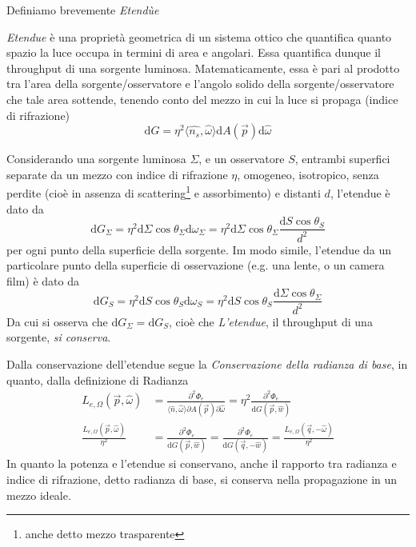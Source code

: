 Definiamo brevemente \textit{Etend\`ue}
\begin{definitionS}
	\textit{Etendue} \`e una propriet\`a geometrica di un sistema ottico che quantifica quanto spazio la luce occupa in termini di area e angolari.
	Essa quantifica dunque il throughput di una sorgente luminosa. Matematicamente, essa \`e pari al prodotto tra l'area della sorgente/osservatore 
	e l'angolo solido della sorgente/osservatore che tale area sottende, tenendo conto del mezzo in cui la luce si propaga (indice di rifrazione)
	\[ \mathrm{d}G = \eta^2\langle \hat{n_s},\hat{\omega} \rangle\mathrm{d}A(\vec{p})\mathrm{d}\hat{\omega}\]
\end{definitionS}
Considerando una sorgente luminosa $\Sigma$, e un osservatore $S$, entrambi superfici separate da un mezzo con indice di rifrazione $\eta$, omogeneo,
isotropico, senza perdite (cio\`e in assenza di scattering\footnote{anche detto mezzo trasparente} e assorbimento) e distanti $d$, l'etendue \`e dato da
\[ \mathrm{d}G_\Sigma = \eta^2\mathrm{d}\Sigma\cos\theta_\Sigma\mathrm{d}\omega_\Sigma 
					  = \eta^2\mathrm{d}\Sigma\cos\theta_\Sigma\frac{\mathrm{d}S\cos\theta_S}{d^2} \]
per ogni punto della superficie della sorgente. Im modo simile, l'etendue da un particolare punto della superficie di osservazione (e.g. una lente, o
un camera film) \`e dato da
\[ \mathrm{d}G_S = \eta^2\mathrm{d}S\cos\theta_S\mathrm{d}\omega_S 
				 = \eta^2\mathrm{d}S\cos\theta_S\frac{\mathrm{d}\Sigma\cos\theta_\Sigma}{d^2}\]
Da cui si osserva che $\mathrm{d}G_\Sigma = \mathrm{d}G_S$, cio\`e che \textit{L'etendue}, il throughput di una sorgente, \textit{si conserva}.\par
Dalla conservazione dell'etendue segue la \textit{Conservazione della radianza di base}, in quanto, dalla definizione di \gls{Radianza}
\begin{align}
	L_{e,\Omega}(\vec{p}, \hat{\omega}) &= \frac{\partial^2\Phi_e}{\langle\hat{n},\hat{\omega}\rangle\partial A(\vec{p})\partial\hat{\omega}} 
						   = \eta^2\frac{\partial^2\Phi_e}{\mathrm{d}G(\vec{p},\hat{w})}\\
	\frac{L_{e,\Omega}(\vec{p}, \hat{\omega})}{\eta^2} &= \frac{\partial^2\Phi_e}{\mathrm{d}G(\vec{p},\hat{w})}
		= \frac{\partial^2\Phi_e}{\mathrm{d}G(\vec{q},-\hat{w})} = \frac{L_{e,\Omega}(\vec{q}, -\hat{\omega})}{\eta^2}
\end{align}
In quanto la potenza e l'etendue si conservano, anche il rapporto tra radianza e indice di rifrazione, detto radianza di base, si conserva nella 
propagazione in un mezzo ideale.\par
